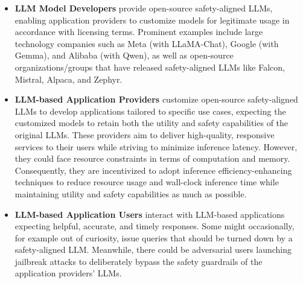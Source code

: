 \begin{itemize}
    \item \textbf{LLM Model Developers} provide open-source safety-aligned LLMs, enabling application providers to customize models for legitimate usage in accordance with licensing terms. Prominent examples include large technology companies such as Meta (with LLaMA-Chat), Google (with Gemma), and Alibaba (with Qwen), as well as open-source organizations/groups that have released safety-aligned LLMs like Falcon, Mistral, Alpaca, and Zephyr.
    \item \textbf{LLM-based Application Providers} 
    customize open-source safety-aligned LLMs to develop applications tailored to specific use cases, expecting the customized models to retain both the utility and safety capabilities of the original LLMs. These providers aim to deliver high-quality, responsive services to their users while striving to minimize inference latency. However, they could face resource constraints in terms of computation and memory. Consequently, they are incentivized to adopt inference efficiency-enhancing techniques to reduce resource usage and wall-clock inference time while maintaining utility and safety capabilities as much as possible.
    \item \textbf{LLM-based Application Users} interact with LLM-based applications expecting helpful, accurate, and timely responses. Some might occasionally, for example out of curiosity, issue queries that should be turned down by a safety-aligned LLM. Meanwhile, there could be adversarial users launching jailbreak attacks \cite{zou2023universal, liu2024autodan, jones2023automatically} to deliberately bypass the safety guardrails of the application providers' LLMs.
\end{itemize}
